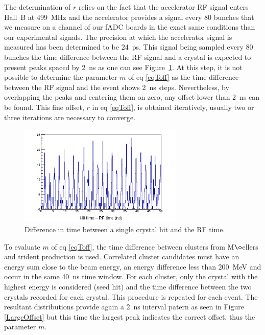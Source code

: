\documentclass[review]{elsarticle}
\begin{document}
The determination of $r$ relies on the fact that the accelerator RF signal enters
Hall~B at 499~MHz and the accelerator provides a signal every 80 bunches that we
measure on a channel of our fADC boards in the exact same conditions than
our experimental signals. The precision at which the accelerator signal is 
measured has been determined to be 24~ps. This signal being sampled every 80 
bunches the time difference between the RF signal and a crystal is expected 
to present peaks spaced by 2~ns as one can see Figure~\ref{RF}. At this step, it is
not possible to determine the parameter $m$ of eq \ref{eqToff} as the time difference
between the RF signal and the event shows 2~ns steps. Nevertheless, by overlapping the peaks and centering them on zero, any offset lower than 2~ns can be found. This fine
offset, $r$ in eq \ref{eqToff}, is obtained iteratively, usually two or three iterations are necessary to converge.


\begin{figure}[ht!]
\centering
\includegraphics[width=0.70\textwidth]{crystalSpectra.png}
\caption{Difference in time between a single crystal hit and the RF time.}
\label{RF}
\end{figure}

To evaluate $m$ of eq \ref{eqToff}, the time difference between 
clusters from M$\o$ellers and trident production is used. 
Correlated cluster candidates must have an energy sum close to the beam energy, 
an energy difference less than 200~MeV and occur in the same 40~ns time window.
For each cluster, only the crystal with the highest energy is considered (seed hit) and the time difference between the two crystals recorded for each crystal. 
This procedure is repeated for each event. The resultant distributions provide 
again a 2~ns interval patern as seen in Figure \ref{LargeOffset} but this time
the largest peak indicates the correct offset, thus the parameter $m$.
\end{document}
